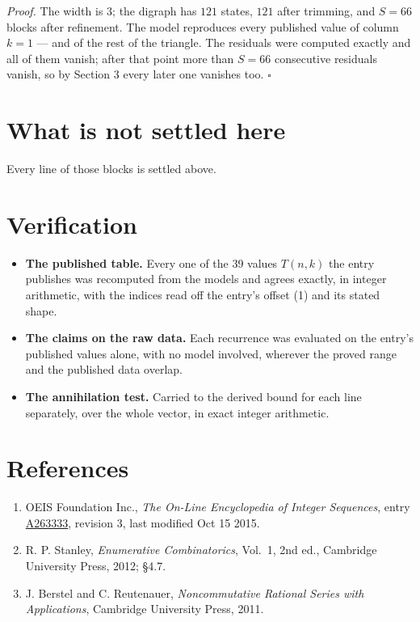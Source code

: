 \documentclass[11pt]{article}
\theoremstyle{definition}
\begin{document}
{\itshape Proof.} The width is $3$; the digraph has $121$ states, $121$ after trimming, and $S = 66$ blocks after refinement. The model reproduces every published value of column $k = 1$ --- and of the rest of the triangle. The residuals were computed exactly and all of them vanish; after that point more than $S = 66$ consecutive residuals vanish, so by Section 3 every later one vanishes too. $\square$

\section{What is not settled here}

Every line of those blocks is settled above.

\section{Verification}

\begin{itemize}

\item {\bfseries The published table.} Every one of the 39 values $T(n,k)$ the entry publishes was recomputed from the models and agrees exactly, in integer arithmetic, with the indices read off the entry's offset (1) and its stated shape.

\item {\bfseries The claims on the raw data.} Each recurrence was evaluated on the entry's published values alone, with no model involved, wherever the proved range and the published data overlap.

\item {\bfseries The annihilation test.} Carried to the derived bound for each line separately, over the whole vector, in exact integer arithmetic.

\end{itemize}

\section{References}

\begin{enumerate}

\item OEIS Foundation Inc., \emph{The On-Line Encyclopedia of Integer Sequences}, entry \href{https://oeis.org/A263333}{A263333}, revision 3, last modified Oct 15 2015.

\item R. P. Stanley, \emph{Enumerative Combinatorics}, Vol.~1, 2nd ed., Cambridge University Press, 2012; \S4.7.

\item J. Berstel and C. Reutenauer, \emph{Noncommutative Rational Series with Applications}, Cambridge University Press, 2011.

\end{enumerate}
\end{document}
